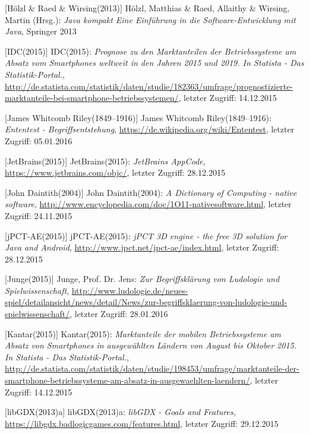 \begin{thebibliography}{}
[Hölzl \& Raed \& Wirsing(2013)] Hölzl, Matthias \& Raed, Allaithy \& Wirsing, Martin (Hrsg.): 
\emph{Java kompakt Eine Einführung in die Software-Entwicklung
	mit Java}, Springer 2013

[IDC(2015)] IDC(2015): \emph{Prognose zu den Marktanteilen der Betriebssysteme am Absatz vom Smartphones weltweit in den Jahren 2015 und 2019. In Statista - Das Statistik-Portal.},
\url{http://de.statista.com/statistik/daten/studie/182363/umfrage/prognostizierte-marktanteile-bei-smartphone-betriebssystemen/}, letzter Zugriff: 14.12.2015

[James Whitcomb Riley(1849–1916)] James Whitcomb Riley(1849–1916): \emph{Ententest - Begriffsentstehung},
\url{https://de.wikipedia.org/wiki/Ententest}, letzter Zugriff: 05.01.2016

[JetBrains(2015)] JetBrains(2015): \emph{JetBrains AppCode},
\url{https://www.jetbrains.com/objc/}, letzter Zugriff: 28.12.2015

[John Daintith(2004)] John Daintith(2004): \emph{A Dictionary of Computing - native software},
\url{http://www.encyclopedia.com/doc/1O11-nativesoftware.html}, letzter Zugriff: 24.11.2015

[jPCT-AE(2015)] jPCT-AE(2015): \emph{jPCT 3D engine - the free 3D solution for Java and Android},
\url{http://www.jpct.net/jpct-ae/index.html}, letzter Zugriff: 28.12.2015

[Junge(2015)] Junge, Prof. Dr. Jens:
\emph{Zur Begriffsklärung von Ludologie und Spielwissenschaft},
\url{http://www.ludologie.de/neues-spiel/detailansicht/news/detail/News/zur-begriffsklaerung-von-ludologie-und-spielwissenschaft/}, letzter Zugriff: 28.01.2016

[Kantar(2015)] Kantar(2015): \emph{Marktanteile der mobilen Betriebssysteme am Absatz von Smartphones in ausgewählten Ländern von August bis Oktober 2015. In Statista - Das Statistik-Portal.},
\url{http://de.statista.com/statistik/daten/studie/198453/umfrage/marktanteile-der-smartphone-betriebssysteme-am-absatz-in-ausgewaehlten-laendern/}, letzter Zugriff: 14.12.2015

[libGDX(2013)a] libGDX(2013)a: \emph{libGDX - Goals and Features},
\url{https://libgdx.badlogicgames.com/features.html}, letzter Zugriff: 29.12.2015


\end{thebibliography}
